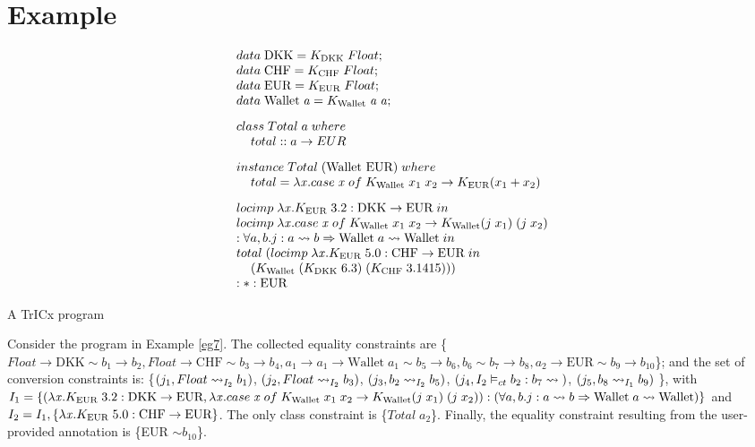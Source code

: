 \section{Example}
\label{7.6}
\begin{eg}
     \[
\begin{array}{@{\hspace{0mm}}l@{\hspace{0mm}}}

  data\;\text{DKK}=K_{\text{DKK}}\; Float;\\
  data\;\text{CHF}=K_{\text{CHF}}\; Float;\\
  data\;\text{EUR}=K_{\text{EUR}}\; Float;\\
  data\;\text{Wallet}\;\tyVar=K_{\text{Wallet}}\; \tyVar \; \tyVar;\\[3mm]
  class\;Total\;a\;where\\\phantom{xx}total :: a \to EUR \\[3mm]
  instance\;Total\;(\text{Wallet EUR})\;where\\\phantom{xx} total=\lambda \tmVar. case\;\tmVar\; of\;K_{\text{Wallet}}\;x_1\;x_2 \to K_{\text{EUR}} (x_1+x_2)\\[3mm]
  \monolocal{\text{DKK}}{\text{EUR}}{\lambda \tmVar . K_{\text{EUR}}\;3.2}\\
  locimp\; \lambda \tmVar. case\;\tmVar\; of\;K_{\text{Wallet}}\;x_1\;x_2 \to K_{\text{Wallet}} (j\;x_1)\;(j\;x_2)\\ :\forall a, b . j : a \rightsquigarrow b \Rightarrow \text{Wallet}\;a\rightsquigarrow \text{Wallet}\;in\\
  total\;(\monolocal{\text{CHF}}{\text{EUR}}{\lambda \tmVar . K_{\text{EUR}}\;5.0}\\ \phantom{xx}(K_{\text{Wallet}}\;(K_{\text{DKK}}\;6.3)\; (K_{\text{CHF}}\;3.1415)))
  \\
  :*:\text{EUR}
\end{array}
\]
\caption{A TrICx program}
\label{eg7}
\end{eg}

Consider the program in Example \ref{eg7}. The collected equality constraints are \{$Float \to \text{DKK} \sim b_1 \to b_2, Float \to \text{CHF} \sim b_3 \to b_4,a_1 \to a_1 \to \text{Wallet} \; a_1 \sim b_5 \to b_6, b_6 \sim b_7 \to b_8, a_2 \to \text{EUR} \sim b_9 \to b_{10}$\}; and the set of conversion constraints is: \{$(j_1,\convX{\imEnv_2}{Float}{b_1})$, $(j_2,\convX{\imEnv_2}{Float}{b_3})$, $(j_3,\convX{\imEnv_2}{b_2}{b_5})$, $(j_4,\convconst{\imEnv_2}{b_2}{b_7})$, $(j_5,\convX{\imEnv_1}{b_8}{b_9})$ \}, with $I_1=\{({\lambda \tmVar . K_{\text{EUR}}\;3.2}:\text{DKK}\to\text{EUR}, \lambda \tmVar. case\;\tmVar\; of\;K_{\text{Wallet}}\;x_1\;x_2 \to K_{\text{Wallet}} (j\;x_1)\;(j\;x_2)) : (\forall a, b . j : a \rightsquigarrow b \Rightarrow \text{Wallet}\;a\rightsquigarrow \text{Wallet})\}$ and $I_2=I_1,\{{\lambda \tmVar . K_{\text{EUR}}\;5.0}:\text{CHF}\to\text{EUR}\}$. The only class constraint is \{$Total\;a_2$\}. Finally, the equality constraint resulting from the user-provided annotation is \{EUR $\sim b_{10}$\}.

